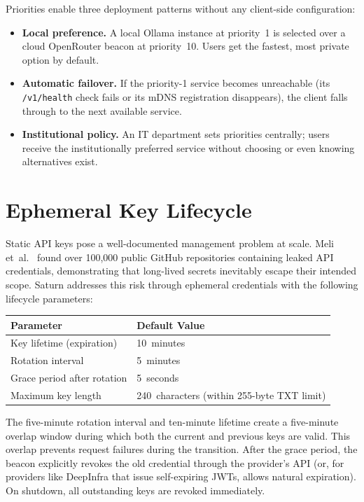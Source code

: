 Priorities enable three deployment patterns without any client-side configuration:

\begin{itemize}
  \item \textbf{Local preference.} A local Ollama instance at priority~1 is selected over a cloud OpenRouter beacon at priority~10. Users get the fastest, most private option by default.
  \item \textbf{Automatic failover.} If the priority-1 service becomes unreachable (its \texttt{/v1/health} check fails or its mDNS registration disappears), the client falls through to the next available service.
  \item \textbf{Institutional policy.} An IT department sets priorities centrally; users receive the institutionally preferred service without choosing or even knowing alternatives exist.
\end{itemize}

\section{Ephemeral Key Lifecycle}
\label{app:key-lifecycle}

Static API keys pose a well-documented management problem at scale. Meli et~al.~\cite{meli2019secrets} found over 100,000 public GitHub repositories containing leaked API credentials, demonstrating that long-lived secrets inevitably escape their intended scope. Saturn addresses this risk through ephemeral credentials with the following lifecycle parameters:

\begin{center}
\begin{tabular}{l l}
\hline
\textbf{Parameter} & \textbf{Default Value} \\
\hline
Key lifetime (expiration)     & 10~minutes \\
Rotation interval             & 5~minutes \\
Grace period after rotation   & 5~seconds \\
Maximum key length            & 240~characters (within 255-byte TXT limit) \\
\hline
\end{tabular}
\end{center}

The five-minute rotation interval and ten-minute lifetime create a five-minute overlap window during which both the current and previous keys are valid. This overlap prevents request failures during the transition. After the grace period, the beacon explicitly revokes the old credential through the provider's API (or, for providers like DeepInfra that issue self-expiring JWTs, allows natural expiration). On shutdown, all outstanding keys are revoked immediately.

